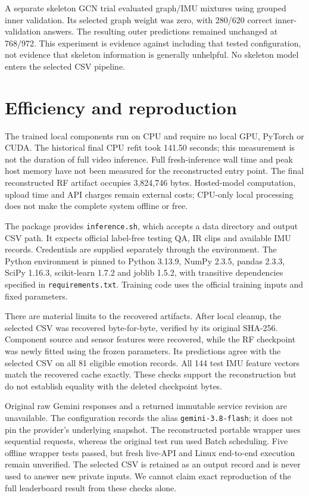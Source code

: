 \documentclass[12pt,a4paper]{article}
\begin{document}
A separate skeleton GCN trial evaluated graph/IMU mixtures using grouped inner validation. Its selected graph weight was zero, with 280/620 correct inner-validation answers. The resulting outer predictions remained unchanged at 768/972. This experiment is evidence against including that tested configuration, not evidence that skeleton information is generally unhelpful. No skeleton model enters the selected CSV pipeline.

\section{Efficiency and reproduction}
The trained local components run on CPU and require no local GPU, PyTorch or CUDA. The historical final CPU refit took 141.50 seconds; this measurement is not the duration of full video inference. Full fresh-inference wall time and peak host memory have not been measured for the reconstructed entry point. The final reconstructed RF artifact occupies 3,824,746 bytes. Hosted-model computation, upload time and API charges remain external costs; CPU-only local processing does not make the complete system offline or free.

The package provides \texttt{inference.sh}, which accepts a data directory and output CSV path. It expects official label-free testing QA, IR clips and available IMU records. Credentials are supplied separately through the environment. The Python environment is pinned to Python 3.13.9, NumPy 2.3.5, pandas 2.3.3, SciPy 1.16.3, scikit-learn 1.7.2 and joblib 1.5.2, with transitive dependencies specified in \texttt{requirements.txt}. Training code uses the official training inputs and fixed parameters.

There are material limits to the recovered artifacts. After local cleanup, the selected CSV was recovered byte-for-byte, verified by its original SHA-256. Component source and sensor features were recovered, while the RF checkpoint was newly fitted using the frozen parameters. Its predictions agree with the selected CSV on all 81 eligible emotion records. All 144 test IMU feature vectors match the recovered cache exactly. These checks support the reconstruction but do not establish equality with the deleted checkpoint bytes.

Original raw Gemini responses and a returned immutable service revision are unavailable. The configuration records the alias \texttt{gemini-3.8-flash}; it does not pin the provider's underlying snapshot. The reconstructed portable wrapper uses sequential requests, whereas the original test run used Batch scheduling. Five offline wrapper tests passed, but fresh live-API and Linux end-to-end execution remain unverified. The selected CSV is retained as an output record and is never used to answer new private inputs. We cannot claim exact reproduction of the full leaderboard result from these checks alone.
\end{document}
